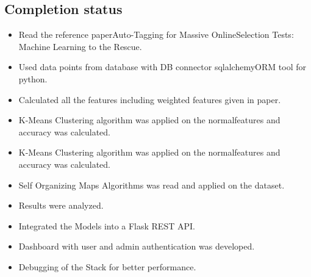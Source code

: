 \documentclass[a4paper,12pt,oneside]{book}
\begin{document}
\subsection*{Completion status}
\begin{itemize}
    \item Read the reference paperAuto-Tagging for Massive OnlineSelection Tests: Machine Learning to the Rescue.
    \item Used data points from database with DB connector sqlalchemyORM tool for python.
    \item Calculated all the features including weighted features given in paper.
    \item K-Means Clustering algorithm was applied on the normalfeatures and accuracy was calculated.
    \item K-Means Clustering algorithm was applied on the normalfeatures and accuracy was calculated.
    \item Self Organizing Maps Algorithms was read and applied on the dataset.
    \item Results were analyzed.
    \item Integrated the Models into a Flask REST API.
    \item Dashboard with user and admin authentication was developed.
    \item Debugging of the Stack for better performance.
\end{itemize}
\end{document}
